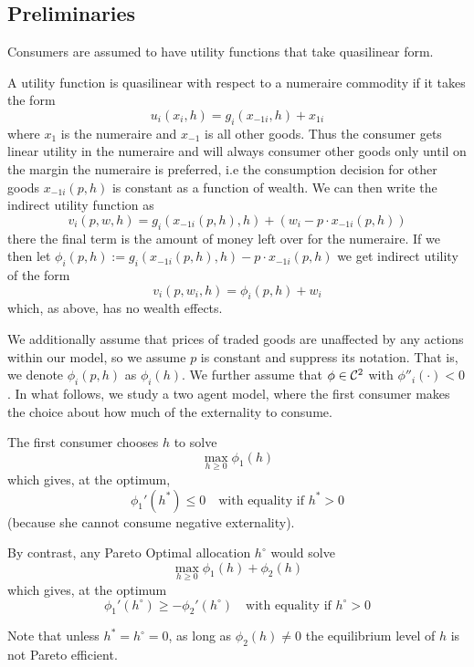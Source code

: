 



\subsection{Preliminaries}
\label{sec:preliminaries}

Consumers are assumed to have utility functions that take quasilinear
form.

\begin{definition}
  A utility function is quasilinear with respect to a numeraire
  commodity if it takes the form
  \[
  u_i(x_{i}, h) = g_i(x_{-1i}, h) + x_{1i}
  \]
  where $x_1$ is the numeraire and $x_{-1}$ is all other goods. Thus
  the consumer gets linear utility in the numeraire and will always
  consumer other goods only until on the margin the numeraire is
  preferred, i.e the consumption decision for other goods
  $x_{-1i}(p,h)$ is constant as a function of wealth. We can then
  write the indirect utility function as
  \[
  v_i(p,w,h) = g_i(x_{-1i}(p,h), h) + (w_i - p \cdot x_{-1i}(p, h))
  \]
  there the final term is the amount of money left over for the
  numeraire. If we then let $\phi_i(p,h) := g_i(x_{-1i}(p,h), h) - p
  \cdot x_{-1i}(p, h)$ we get indirect utility of the form
  \[
  v_i(p, w_i, h) = \phi_i(p,h) + w_i
  \]
  which, as above, has no wealth effects.
\end{definition}

We additionally assume that prices of traded goods are unaffected by
any actions within our model, so we assume $p$ is constant and
suppress its notation. That is, we denote $\phi_i(p,h)$ as
$\phi_i(h)$. We further assume that $\phi \in {\cal C}^2$ with
$\phi''_i(\cdot) < 0$. In what follows, we study a two agent model,
where the first consumer makes the choice about how much of the
externality to consume.

The first consumer chooses $h$ to solve
\[
\max_{h \geq 0} \phi_1(h)
\]
which gives, at the optimum,
\[
\phi_1'(h^*) \leq 0 \quad \text{with equality if } h^* > 0
\]
(because she cannot consume negative externality).

By contrast, any Pareto Optimal allocation $h^\circ$ would solve
\[
\max_{h \geq 0} \phi_1(h) + \phi_2(h)
\]
which gives, at the optimum
\[
\phi_1'(h^\circ) \geq -\phi_2'(h^\circ) \quad \text{with equality if } h^\circ > 0
\]

Note that unless $h^* = h^\circ = 0$, as long as $\phi_2(h) \neq 0$
the equilibrium level of $h$ is not Pareto efficient.

